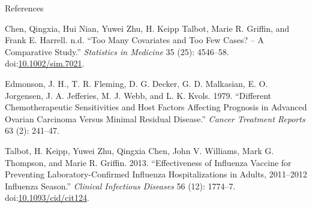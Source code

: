 \documentclass[ignorenonframetext,a4paper]{beamer}
\begin{document}
\begin{frame}{References}

\footnotesize

\hypertarget{refs}{}
\hypertarget{ref-chen_2016}{}
Chen, Qingxia, Hui Nian, Yuwei Zhu, H. Keipp Talbot, Marie R. Griffin,
and Frank E. Harrell. n.d. ``Too Many Covariates and Too Few Cases? -- A
Comparative Study.'' \emph{Statistics in Medicine} 35 (25): 4546--58.
doi:\href{https://doi.org/10.1002/sim.7021}{10.1002/sim.7021}.

\hypertarget{ref-edmonson_1979}{}
Edmonson, J. H., T. R. Fleming, D. G. Decker, G. D. Malkasian, E. O.
Jorgensen, J. A. Jefferies, M. J. Webb, and L. K. Kvols. 1979.
``Different Chemotherapeutic Sensitivities and Host Factors Affecting
Prognosis in Advanced Ovarian Carcinoma Versus Minimal Residual
Disease.'' \emph{Cancer Treatment Reports} 63 (2): 241--47.

\hypertarget{ref-talbot_2013}{}
Talbot, H. Keipp, Yuwei Zhu, Qingxia Chen, John V. Williams, Mark G.
Thompson, and Marie R. Griffin. 2013. ``Effectiveness of Influenza
Vaccine for Preventing Laboratory-Confirmed Influenza Hospitalizations
in Adults, 2011--2012 Influenza Season.'' \emph{Clinical Infectious
Diseases} 56 (12): 1774--7.
doi:\href{https://doi.org/10.1093/cid/cit124}{10.1093/cid/cit124}.

\end{frame}
\end{document}
